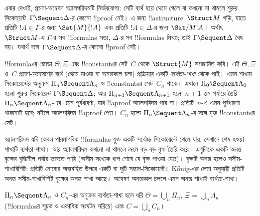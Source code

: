 \documentclass[../../../include/open-logic-section]{subfiles}
\begin{document}


এবার দেখাই, প্রমাণ-অন্বেষণ
অ্যালগরিদমটি নির্ভরযোগ্য:
সেটি ব্যর্থ হয়ে থেমে গেলে
বা কখনো না থামলে শুরুর
সিকোয়েন্ট~$\Gamma \Sequent \Delta$-র
কোনো !!{proof} নেই। এ জন্য
!!a{structure}~$\Struct M$ গড়ি,
যাতে প্রতিটি $!A \in \Gamma$-র জন্য
$\Sat{M}{!A}$ এবং প্রতিটি
$!A \in \Delta$-র জন্য
$\Sat/{M}{!A}$।
অর্থাৎ~$\Struct M$-এ
$\Gamma$-র সব !!{formula}s সত্য,
$\Delta$-র সব !!{formula}s মিথ্যা;
তাই $\Gamma \Sequent \Delta$
বৈধ নয়।  যথার্থ
বলে $\Gamma \Sequent \Delta$-র
কোনো !!{proof} নেই।

!!{formula}sর জোড়া
$\Theta, \Xi$ এবং
!!{constant}sর সেট~$C$ থেকে
$\Struct{M}$ সংজ্ঞায়িত করি।
এই $\Theta, \Xi$ ও~$C$
প্রমাণ-অন্বেষণের
ব্যর্থ (থেমে যাওয়া বা অনন্তকাল চলা)
প্রক্রিয়ার একটি
\emph{ব্যর্থতা-শাখা} থেকে পাই।
এমন শাখায় সিকোয়েন্টের অনুক্রম
$\Pi_n \Sequent \Lambda_n$ ও
!!{constant}sর সেট~$C_n$ থাকে।
এখানে $\Pi_0 \Sequent \Lambda_0$
হলো শুরুর সিকোয়েন্ট
$\Gamma \Sequent \Delta$;
আর
$\Pi_{n+1} \Sequent \Lambda_{n+1}$
হলো $n+1$-তম পর্যায়ে তৈরি
$\Pi_n \Sequent \Lambda_n$-এর
এমন পূর্বধারণা, যার !!a{proof}
অ্যালগরিদম পায় না। প্রতিটি~$n$-এ
এমন পূর্বধারণা থাকতেই হবে;
নইলে অ্যালগরিদম !!a{proof} পেত।
$C_n$ হলো
$\Pi_n \Sequent \Lambda_n$-র
সঙ্গে যুক্ত !!{constant}sর সেট।

অ্যালগরিদম যদি কেবল
পারমাণবিক !!{formula}s-যুক্ত
একটি সর্বোচ্চ সিকোয়েন্টে
থেমে যায়, সেখানে শেষ হওয়া
শাখাটি ব্যর্থতা-শাখা।
আর অ্যালগরিদম কখনো না থামলে
ক্রমে বড় বড় বৃক্ষ তৈরি করে।
এগুলিকে একটি অনন্ত বৃক্ষের
বৃদ্ধিশীল পর্যায় ভাবতে পারি
(অসীম সংখ্যক ধাপ শেষে
যে বৃক্ষ পাওয়া যেত)।
বৃক্ষটি অনন্ত হলেও
সসীম-শাখাবিশিষ্ট: প্রতিটি
নোডের অব্যবহিত উপরে
একটি বা দুটি সন্তান-সিকোয়েন্ট।
K\H{o}nig-এর লেমা অনুযায়ী
প্রতিটি অনন্ত সসীম-শাখাবিশিষ্ট
বৃক্ষের অনন্ত শাখা আছে।
অন্বেষণ অনন্তকাল চললে
এমন অনন্ত শাখাই ব্যর্থতা-শাখা।

$\Pi_n \Sequent \Lambda_n$
ও $C_n$-এর অনুক্রম
ব্যর্থতা-শাখা হলে ধরি
$\Theta = \bigcup_n \Pi_n$,
$\Xi = \bigcup_n \Lambda_n$
(!!{formula}sর সূচক
ও একাধিক সংঘটন সরিয়ে)
এবং $C = \bigcup_n C_n$।
\end{document}
